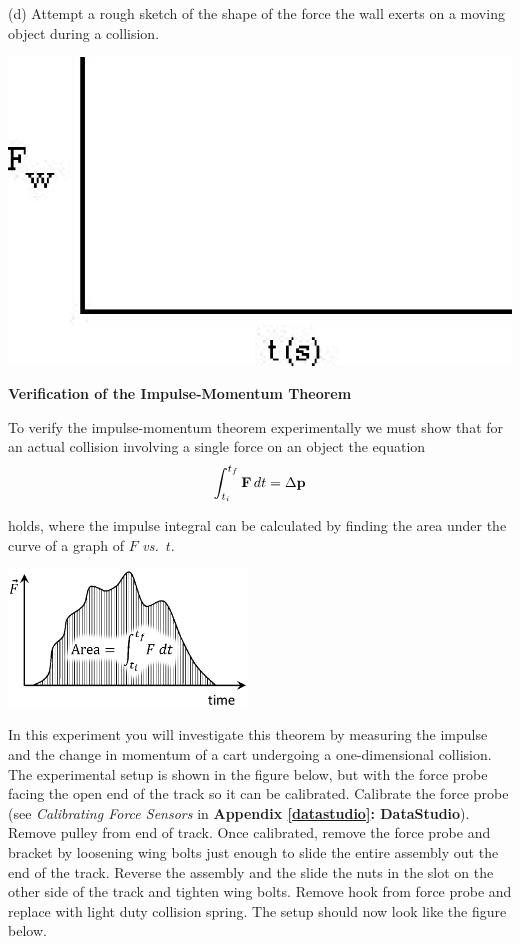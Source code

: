 (d) Attempt a rough sketch of the shape of the force the wall exerts on a moving
object during a collision.

\vspace{0.3cm}
{\par\centering \includegraphics{impulse/impulse_fig2.eps} \par}
\vspace{0.3cm}

\textbf{Verification of the Impulse-Momentum Theorem} 

To verify the impulse-momentum theorem experimentally we must show that for
an actual collision involving a single force on an object the equation
\[
\int_{t_{i}}^{t_{f}}{\bf F}\,dt=\Delta {\bf p}\]


holds, where the impulse integral can be calculated by finding the area under
the curve of a graph of $F$ \textit{vs.}~$t$.

{\par\centering \includegraphics[width=2.5in]{impulse/impulse_fig3_new.eps} \par}

In this experiment you will investigate this theorem by measuring the impulse
and the change in momentum of a cart undergoing a one-dimensional collision.
The experimental setup is shown in the figure below, but with the force probe 
facing the open end of the track so it can be calibrated.  Calibrate the force probe 
(see \textit{Calibrating Force Sensors} in \textbf{Appendix \ref{datastudio}: DataStudio}). 
Remove pulley from end of track. Once calibrated, remove the force probe and 
bracket by loosening wing bolts just enough to slide the entire assembly out the 
end of the track. Reverse the assembly and the slide the nuts in the slot on the 
other side of the track and tighten wing bolts. Remove hook from force probe and 
replace with light duty collision spring. The setup should now look like the figure 
below.

